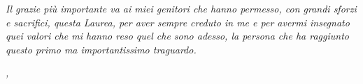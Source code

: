 \noindent \textit{Il grazie più importante va ai miei genitori che hanno permesso, con grandi sforzi e sacrifici, questa Laurea, per aver sempre creduto in me e per avermi insegnato quei valori che mi hanno reso quel che sono adesso, la persona che ha raggiunto questo primo ma importantissimo traguardo.}

\bigskip

\noindent\textit{\myLocation, \myTime}
\hfill \myName

\endgroup

